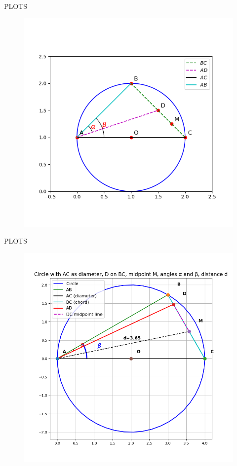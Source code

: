 \documentclass{beamer}
\begin{document}
\begin{frame}{PLOTS}
    \begin{figure}
        \centering
        \includegraphics[width=0.75\columnwidth]{figs/fig1.png}
        \caption{}
        \label{fig:placeholder}
    \end{figure}
\end{frame}
\begin{frame}{PLOTS}
   \begin{figure}
        \centering
        \includegraphics[width=0.75\columnwidth]{figs/fig2.png}
        \caption{}
        \label{fig:placeholder}
    \end{figure} 
\end{frame}
\end{document}
